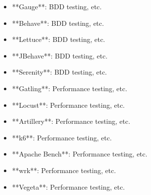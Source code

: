 \documentclass[11pt,a4paper]{article}
\begin{document}
\begin{itemize}
\item **Gauge**: BDD testing, etc.
\end{itemize}

\begin{itemize}
\item **Behave**: BDD testing, etc.
\end{itemize}

\begin{itemize}
\item **Lettuce**: BDD testing, etc.
\end{itemize}

\begin{itemize}
\item **JBehave**: BDD testing, etc.
\end{itemize}

\begin{itemize}
\item **Serenity**: BDD testing, etc.
\end{itemize}

\begin{itemize}
\item **Gatling**: Performance testing, etc.
\end{itemize}

\begin{itemize}
\item **Locust**: Performance testing, etc.
\end{itemize}

\begin{itemize}
\item **Artillery**: Performance testing, etc.
\end{itemize}

\begin{itemize}
\item **k6**: Performance testing, etc.
\end{itemize}

\begin{itemize}
\item **Apache Bench**: Performance testing, etc.
\end{itemize}

\begin{itemize}
\item **wrk**: Performance testing, etc.
\end{itemize}

\begin{itemize}
\item **Vegeta**: Performance testing, etc.
\end{itemize}
\end{document}
